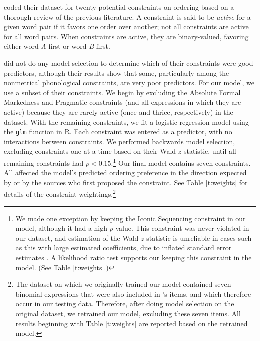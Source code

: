 \documentclass[authoryear]{elsarticle}
\begin{document}
\citeauthor{Benor:2006gv} coded their dataset for twenty potential constraints on ordering based on a thorough review of the previous literature. A constraint is said to be \emph{active} for a given word pair if it favors one order over another; not all constraints are active for all word pairs. When constraints are active, they are binary-valued, favoring either word \emph{A} first or word \emph{B} first.

\citeauthor{Benor:2006gv} did not do any model selection to determine which of their constraints were good predictors, although their results show that some, particularly among the nonmetrical phonological constraints, are very poor predictors. For our model, we use a subset of their constraints. We begin by excluding the Absolute Formal Markedness and Pragmatic constraints (and all expressions in which they are active) because they are rarely active (once and thrice, respectively) in the dataset. With the remaining constraints, we fit a logistic regression model using the {\tt glm} function in R. Each constraint was entered as a predictor, with no interactions between constraints. We performed backwards model selection, excluding constraints one at a time based on their Wald $z$ statistic, until all remaining constraints had $p < 0.15$.\footnote{\label{waldz}We made one exception by keeping the Iconic Sequencing constraint in our model, although it had a high $p$ value. This constraint was never violated in our dataset, and estimation of the Wald $z$ statistic is unreliable in cases such as this with large estimated coefficients, due to inflated standard error estimates \citep{Agresti:2002vi,Menard:2002tc}. A likelihood ratio test supports our keeping this constraint in the model. (See Table \ref{t:weights}.)} Our final model contains seven constraints. All affected the model's predicted ordering preference in the direction expected by \citeauthor{Benor:2006gv} or by the sources who first proposed the constraint. See Table \ref{t:weights} for details of the constraint weightings.\footnote{The dataset on which we originally trained our model contained seven binomial expressions that were also included in \citeauthor{SiyanovaChanturia:2011ep}'s \citeyearpar{SiyanovaChanturia:2011ep} items, and which therefore occur in our testing data. Therefore, after doing model selection on the original dataset, we retrained our model, excluding these seven items. All results beginning with Table \ref{t:weights} are reported based on the retrained model.}
\end{document}
